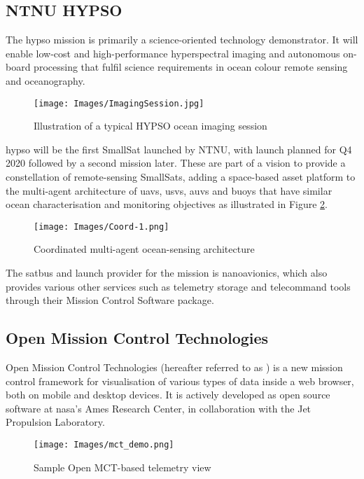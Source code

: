 \subsection{NTNU HYPSO}
The \acrshort{hypso} mission is primarily a science-oriented technology demonstrator. It will enable low-cost and high-performance hyperspectral imaging and autonomous on-board processing that fulfil science requirements in ocean colour remote sensing and oceanography.

\begin{figure}[ht]
    \centering
    \texttt{[image: Images/ImagingSession.jpg]}
    \caption{Illustration of a typical HYPSO ocean imaging session}
    \label{fig:imaging}
\end{figure}

\acrshort{hypso} will be the first SmallSat launched by NTNU, with launch planned for Q4 2020 followed by a second mission later. These are part of a vision to provide a constellation of remote-sensing SmallSats, adding a space-based asset platform to the multi-agent architecture of \acrshort{uav}s, \acrshort{usv}s, \acrshort{auv}s and buoys that have similar ocean characterisation and monitoring objectives as illustrated in Figure \ref{fig:ocean}.

\begin{figure}[ht]
    \centering
    \texttt{[image: Images/Coord-1.png]}
    \caption{Coordinated multi-agent ocean-sensing architecture}
    \label{fig:ocean}
\end{figure}

The \gls{satbus} and launch provider for the mission is \Gls{nanoavionics}, which also provides various other services such as telemetry storage and telecommand tools through their Mission Control Software package.

\subsection{Open Mission Control Technologies}
Open Mission Control Technologies (hereafter referred to as ) is a new mission control framework for visualisation of various types of data inside a web browser, both on mobile and desktop devices. It is actively developed as open source software at \acrshort{nasa}'s Ames Research Center, in collaboration with the Jet Propulsion Laboratory. 

\begin{figure}[H]
    \centering
    \texttt{[image: Images/mct\_demo.png]}
    \caption{Sample Open MCT-based telemetry view}
    \label{fig:omctdemo}
\end{figure}

